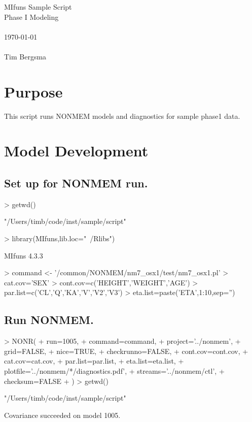 
\usepackage{Sweave}

 

\vspace*{2cm}
\begin{center}
{\Large MIfuns Sample Script}\\
\vspace{1.5cm}
{\Large Phase I Modeling}\\
~\\
\today\\
~\\
Tim Bergsma\\
\end{center}
\newpage

\section{Purpose}
This script runs NONMEM models and diagnostics for sample phase1 data.
\section{Model Development}
\subsection{Set up for NONMEM run.}
\begin{Schunk}
\begin{Sinput}
> getwd()
\end{Sinput}
\begin{Soutput}
[1] "/Users/timb/code/inst/sample/script"
\end{Soutput}
\begin{Sinput}
> library(MIfuns,lib.loc="~/Rlibs")
\end{Sinput}
\begin{Soutput}
MIfuns 4.3.3 
\end{Soutput}
\begin{Sinput}
> command <- '/common/NONMEM/nm7_osx1/test/nm7_osx1.pl'
> cat.cov='SEX'
> cont.cov=c('HEIGHT','WEIGHT','AGE')
> par.list=c('CL','Q','KA','V','V2','V3')
> eta.list=paste('ETA',1:10,sep='')
\end{Sinput}
\end{Schunk}
\subsection{Run NONMEM.}
\begin{Schunk}
\begin{Sinput}
> NONR(
+      run=1005,
+      command=command,
+      project='../nonmem',
+      grid=FALSE,
+      nice=TRUE,
+      checkrunno=FALSE,
+      cont.cov=cont.cov,
+      cat.cov=cat.cov,
+      par.list=par.list,
+      eta.list=eta.list,
+      plotfile='../nonmem/*/diagnostics.pdf',
+      streams='../nonmem/ctl',
+      checksum=FALSE
+ )
> getwd()
\end{Sinput}
\begin{Soutput}
[1] "/Users/timb/code/inst/sample/script"
\end{Soutput}
\end{Schunk}
Covariance succeeded on model 1005.
